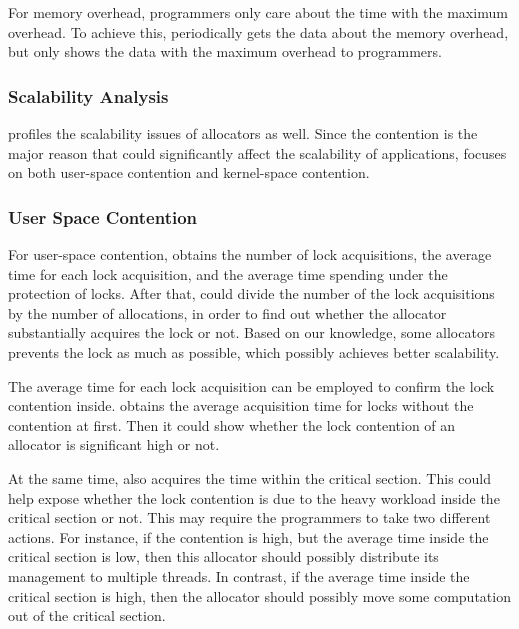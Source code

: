  



For memory overhead, programmers only care about the time with the maximum overhead. To achieve this, \MP{} periodically gets the data about the memory overhead, but only shows the data with the maximum overhead to programmers.  
 
\subsubsection{Scalability Analysis} 

\MP{} profiles the scalability issues of allocators as well. Since the contention is the major reason that could significantly affect the scalability of applications, \MP{} focuses on both user-space contention and kernel-space contention. 

\subsubsection{User Space Contention}
For user-space contention, \MP{} obtains the number of lock acquisitions, the average time for each lock acquisition, and the average time spending under the protection of locks. After that, \MP{} could divide the number of the lock acquisitions by the number of allocations, in order to find out whether the allocator substantially acquires the lock or not. Based on our knowledge, some allocators prevents the lock as much as possible, which possibly achieves better scalability. 

The average time for each lock acquisition can be employed to confirm the lock contention inside. \MP{} obtains the average acquisition time for locks without the contention at first. Then it could show whether the lock contention of an allocator is significant high or not.

At the same time, \MP{} also acquires the time within the critical section. This could help expose whether the lock contention is due to the heavy workload inside the critical section or not. This may require the programmers to take two different actions. For instance, if the contention is high, but the average time inside the critical section is low, then this allocator should possibly distribute its management to multiple threads. In contrast, if the average time inside the critical section is high, then the allocator should possibly move some computation out of the critical section. 

